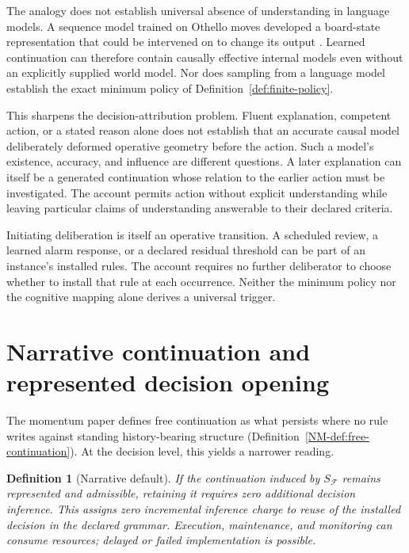 \documentclass[11pt,a4paper]{article}
\newtheorem{definition}{Definition}[section]
\theoremstyle{remark}
\newcommand{\Frame}{\mathcal F}
\begin{document}
The analogy does not establish universal absence of understanding in language
models. A sequence model trained on Othello moves developed a board-state
representation that could be intervened on to change its output
\citep{li2023}. Learned continuation can therefore contain causally effective
internal models even without an explicitly supplied world model. Nor does
sampling from a language model establish the exact minimum policy of
Definition~\ref{def:finite-policy}.

This sharpens the decision-attribution problem. Fluent explanation, competent
action, or a stated reason alone does not establish that an accurate causal
model deliberately deformed operative geometry before the action. Such a
model's existence, accuracy, and influence are different questions. A later
explanation can itself be a generated continuation whose relation to the
earlier action must be investigated. The account permits action without
explicit understanding while leaving particular claims of understanding
answerable to their declared criteria.

Initiating deliberation is itself an operative transition. A scheduled review,
a learned alarm response, or a declared residual threshold can be part of
an instance's installed rules. The account requires no further deliberator
to choose whether to install that rule at each occurrence. Neither the
minimum policy nor the cognitive mapping alone derives a universal trigger.

\section{Narrative continuation and represented decision opening}\label{sec:opening}

The momentum paper defines free continuation as what persists where no rule
writes against standing history-bearing structure (Definition~\ref{NM-def:free-continuation}). At the decision level, this yields a narrower reading.

\begin{definition}[Narrative default]\label{def:narrative-default}
If the continuation induced by \(S_{\Frame}\) remains represented and
admissible, retaining it requires zero \emph{additional decision inference}.
This assigns zero incremental inference charge to reuse of the installed
decision in the declared grammar. Execution, maintenance, and monitoring
can consume resources; delayed or failed implementation is possible.
\end{definition}
\end{document}
